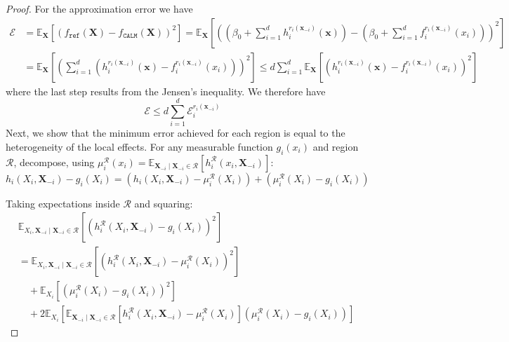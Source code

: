 \begin{proof}
For the approximation error we have
\begin{align*}
\mathcal{E} &= \mathbb{E}_{\mathbf{X}}\left[\left(f_{\texttt{ref}}(\mathbf{X}) - f_{\texttt{CALM}}(\mathbf{X})\right)^2\right] = \mathbb{E}_{\mathbf{X}}\left[\left(\left(\beta_0+ \sum_{i = 1}^dh_i^{r_i(\mathbf{x}_{-i})}(\mathbf{x})\right) - \left(\beta_0 + \sum_{i=1}^{d}f_i^{r_i(\mathbf{x}_{-i})}(x_i)\right)\right)^2\right]\nonumber \\
&=\mathbb{E}_{\mathbf{X}}\left[\left(\sum_{i = 1}^d\left(h_i^{r_i(\mathbf{x}_{-i})}(\mathbf{x}) - f_i^{r_i(\mathbf{x}_{-i})}(x_i)\right)\right)^2\right]
\leq d\sum_{i=1} ^{d}\mathbb{E}_{\mathbf{X}}\left[\left(h_i^{r_i(\mathbf{x}_{-i})}(\mathbf{x}) - f_i^{r_i(\mathbf{x}_{-i})}(x_i)\right)^2\right]
\end{align*}
where the last step results from the Jensen's inequality. We therefore have
\begin{equation}
\mathcal{E} \leq d\sum_{i=1}^{d}\mathcal{E}^{r_i(\mathbf{x}_{-i})}_i
 \label{eq:error_approx}
\end{equation}
Next, we show that the minimum error achieved for each region is equal to the heterogeneity of the local effects. For any measurable function $g_i(x_i)$ and region $\mathcal{R}$, decompose, using $\mu^{\mathcal{R}}_i(x_i) = \mathbb{E}_{\mathbf{X}_{-i}\mid \mathbf{X}_{-i} \in \mathcal{R}}\left[h^{\mathcal{R}}_i(x_i, \mathbf{X}_{-i})\right]$:
\begin{equation*}
h_i(X_i, \mathbf{X}_{-i}) - g_i(X_i) = \left(h_i(X_i, \mathbf{X}_{-i}) - \mu^{\mathcal{R}}_i(X_i)\right) + \left(\mu^{\mathcal{R}}_i(X_i) - g_i(X_i)\right)
\end{equation*}

Taking expectations inside $\mathcal{R}$ and squaring:
\begin{align*}
&\mathbb{E}_{X_i, \mathbf{X}_{-i} \mid \mathbf{X}_{-i}\in \mathcal{R}}\left[\left(h_i^{\mathcal{R}}(X_i, \mathbf{X}_{-i}) - g_i(X_i)\right)^2\right] \\
&= \mathbb{E}_{X_i, \mathbf{X}_{-i} \mid \mathbf{X}_{-i}\in \mathcal{R}}\left[\left(h_i^{\mathcal{R}}(X_i, \mathbf{X}_{-i}) - \mu^{\mathcal{R}}_i(X_i)\right)^2\right] \\
&\quad + \mathbb{E}_{X_i}\left[\left(\mu^{\mathcal{R}}_i(X_i) - g_i(X_i)\right)^2\right] \\
&\quad + 2\mathbb{E}_{X_i}\left[\mathbb{E}_{\mathbf{X}_{-i}\mid \mathbf{X}_{-i} \in \mathcal{R}}\left[h_i^{\mathcal{R}}(X_i, \mathbf{X}_{-i}) - \mu^{\mathcal{R}}_i(X_i)\right]\left(\mu^{\mathcal{R}}_i(X_i) - g_i(X_i)\right)\right]
\end{align*}


\end{proof}
